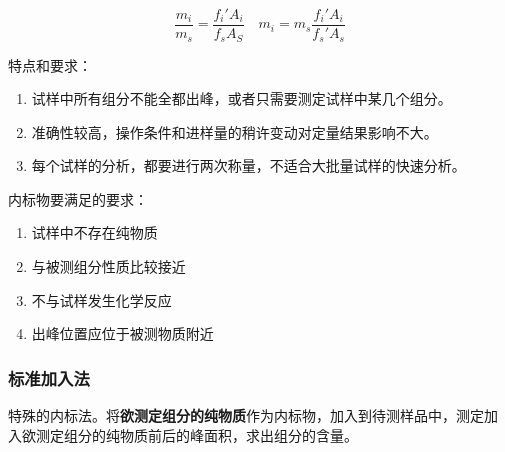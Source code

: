 \begin{equation}
    \frac{m_i}{m_s} = \frac{f_i' A_i}{f_s A_S} \quad
    m_i = m_s \frac{f_i' A_i}{f_s' A_s}
\end{equation}


特点和要求：

\begin{enumerate}
    \item 试样中所有组分不能全都出峰，或者只需要测定试样中某几个组分。
    \item 准确性较高，操作条件和进样量的稍许变动对定量结果影响不大。
    \item 每个试样的分析，都要进行两次称量，不适合大批量试样的快速分析。
\end{enumerate}


内标物要满足的要求：

\begin{enumerate}
    \item 试样中不存在纯物质
    \item 与被测组分性质比较接近
    \item 不与试样发生化学反应
    \item 出峰位置应位于被测物质附近
\end{enumerate}

\subsubsection{标准加入法}

特殊的内标法。将\textbf{欲测定组分的纯物质}作为内标物，加入到待测样品中，测定加
入欲测定组分的纯物质前后的峰面积，求出组分的含量。

